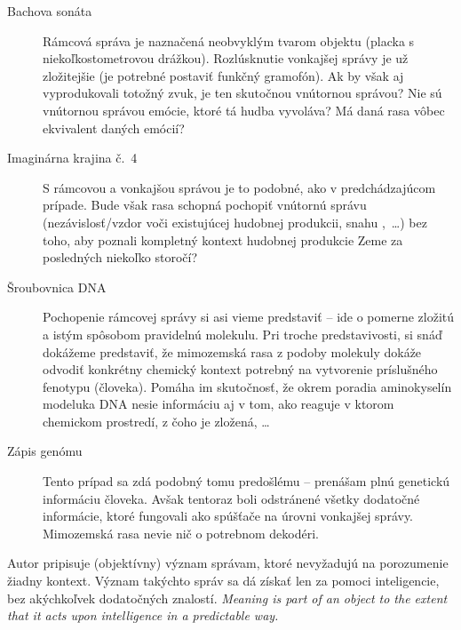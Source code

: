 \documentclass[12pt]{article}
\begin{document}
\begin{description}
\item[Bachova sonáta] Rámcová správa je naznačená neobvyklým tvarom objektu (placka s niekoľkostometrovou drážkou). Rozlúsknutie vonkajšej správy je už zložitejšie (je potrebné postaviť funkčný gramofón). Ak by však aj vyprodukovali totožný zvuk, je ten skutočnou vnútornou správou? Nie sú vnútornou správou emócie, ktoré tá hudba vyvoláva? Má daná rasa vôbec ekvivalent daných emócií?
\item[Imaginárna krajina č.\ 4] S rámcovou a vonkajšou správou je to podobné, ako v predchádzajúcom prípade. Bude však rasa schopná pochopiť vnútornú správu (nezávislosť/vzdor voči existujúcej hudobnej produkcii, snahu ,~\dots) bez toho, aby poznali kompletný kontext hudobnej produkcie Zeme za posledných niekoľko storočí?
\item[Šroubovnica DNA] Pochopenie rámcovej správy si asi vieme predstaviť -- ide o pomerne zložitú a istým spôsobom  pravidelnú molekulu. Pri troche predstavivosti, si snáď dokážeme predstaviť, že mimozemská rasa z podoby molekuly dokáže odvodiť konkrétny chemický kontext potrebný na vytvorenie príslušného fenotypu (človeka). Pomáha im skutočnosť, že okrem poradia aminokyselín modeluka DNA nesie informáciu aj v tom, ako reaguje v ktorom chemickom prostredí, z čoho je zložená, \dots
\item[Zápis genómu] Tento prípad sa zdá podobný tomu predošlému -- prenášam plnú genetickú informáciu človeka. Avšak tentoraz boli odstránené všetky dodatočné informácie, ktoré fungovali ako spúšťače na úrovni vonkajšej správy. Mimozemská rasa nevie nič o potrebnom dekodéri.
\end{description}

\noindent
Autor pripisuje  (objektívny) význam správam, ktoré nevyžadujú na porozumenie žiadny kontext. Význam takýchto správ sa dá získať len za pomoci inteligencie, bez akýchkoľvek dodatočných znalostí. \textit{Meaning is part of an object to the extent that it acts upon intelligence in a predictable way.}
\end{document}
